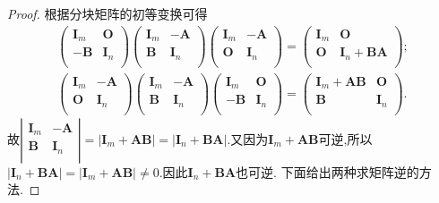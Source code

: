 \documentclass[../../main.tex]{subfiles}%
\begin{document}
\begin{proof}

根据分块矩阵的初等变换可得
\begin{align}
\left( \begin{matrix}
\boldsymbol{I}_m&		\boldsymbol{O}\\
-\boldsymbol{B}&		\boldsymbol{I}_n\\
\end{matrix} \right) \left( \begin{matrix}
\boldsymbol{I}_m&		-\boldsymbol{A}\\
\boldsymbol{B}&		\boldsymbol{I}_n\\
\end{matrix} \right) \left( \begin{matrix}
\boldsymbol{I}_m&		-\boldsymbol{A}\\
\boldsymbol{O}&		\boldsymbol{I}_n\\
\end{matrix} \right) =\left( \begin{matrix}
\boldsymbol{I}_m&		\boldsymbol{O}\\
\boldsymbol{O}&		\boldsymbol{I}_n+\boldsymbol{BA}\\
\end{matrix} \right) ;\label{eq:::241211123123-----1241231---121}
\\
\left( \begin{matrix}
\boldsymbol{I}_m&		-\boldsymbol{A}\\
\boldsymbol{O}&		\boldsymbol{I}_n\\
\end{matrix} \right) \left( \begin{matrix}
\boldsymbol{I}_m&		-\boldsymbol{A}\\
\boldsymbol{B}&		\boldsymbol{I}_n\\
\end{matrix} \right) \left( \begin{matrix}
\boldsymbol{I}_m&		\boldsymbol{O}\\
-\boldsymbol{B}&		\boldsymbol{I}_n\\
\end{matrix} \right) =\left( \begin{matrix}
\boldsymbol{I}_m+\boldsymbol{AB}&		\boldsymbol{O}\\
\boldsymbol{B}&		\boldsymbol{I}_n\\
\end{matrix} \right) .\label{eq:::241211123123-----1241231---123}
\end{align}
故$\left| \begin{matrix}
\boldsymbol{I}_m&		-\boldsymbol{A}\\
\boldsymbol{B}&		\boldsymbol{I}_n\\
\end{matrix} \right|=\left| \boldsymbol{I}_m+\boldsymbol{AB} \right|=\left| \boldsymbol{I}_n+\boldsymbol{BA} \right|$.又因为$\boldsymbol{I}_m+\boldsymbol{AB}$可逆,所以$\left| \boldsymbol{I}_n+\boldsymbol{BA} \right|=\left| \boldsymbol{I}_m+\boldsymbol{AB} \right|\ne0$.因此$\boldsymbol{I}_n+\boldsymbol{BA}$也可逆.
下面给出两种求矩阵逆的方法.


\end{proof}
\end{document}
